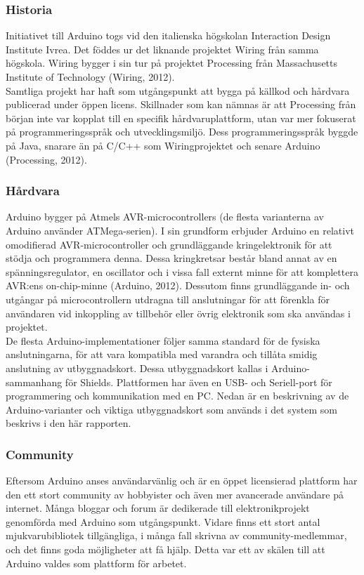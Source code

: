 \documentclass[a4paper,11pt]{article}
\begin{document}
\subsubsection{Historia}
Initiativet till Arduino togs vid den italienska högskolan Interaction Design Institute Ivrea. Det föddes ur det liknande projektet Wiring från samma högskola. Wiring bygger i sin tur på projektet Processing från Massachusetts Institute of Technology (Wiring, 2012). \\

Samtliga projekt har haft som utgångspunkt att bygga på källkod och hårdvara publicerad under öppen licens. Skillnader som kan nämnas är att Processing från början inte var kopplat till en specifik hårdvaruplattform, utan var mer fokuserat på programmeringsspråk och utvecklingsmiljö. Dess programmeringsspråk byggde på Java, snarare än på C/C++ som Wiringprojektet och senare Arduino (Processing, 2012).

\subsubsection{Hårdvara}
Arduino bygger på Atmels AVR-microcontrollers (de flesta varianterna av Arduino använder ATMega-serien). I sin grundform erbjuder Arduino en relativt omodifierad AVR-microcontroller och grundläggande kringelektronik för att stödja och programmera denna. Dessa kringkretsar består bland annat av en spänningsregulator, en oscillator och i vissa fall externt minne för att komplettera AVR:ens on-chip-minne  (Arduino, 2012). Dessutom finns grundläggande in- och utgångar på microcontrollern utdragna till anslutningar för att förenkla för användaren vid inkoppling av tillbehör eller övrig elektronik som ska användas i projektet. \\

De flesta Arduino-implementationer följer samma standard för de fysiska anslutningarna, för att vara kompatibla med varandra och tillåta smidig anslutning av utbyggnadskort. Dessa utbyggnadskort kallas i Arduino-sammanhang för Shields. Plattformen har även en USB- och Seriell-port för programmering och kommunikation med en PC. Nedan är en beskrivning av de Arduino-varianter och viktiga utbyggnadskort som används i det system som beskrivs i den här rapporten.

\subsubsection{Community}
Eftersom Arduino anses användarvänlig och är en öppet licensierad plattform har den ett stort community av hobbyister och även mer avancerade användare på internet. Många bloggar och forum är dedikerade till elektronikprojekt genomförda med Arduino som utgångspunkt. Vidare finns ett stort antal mjukvarubibliotek tillgängliga, i många fall skrivna av community-medlemmar, och det finns goda möjligheter att få hjälp. Detta var ett av skälen till att Arduino valdes som plattform för arbetet. \\
\end{document}
